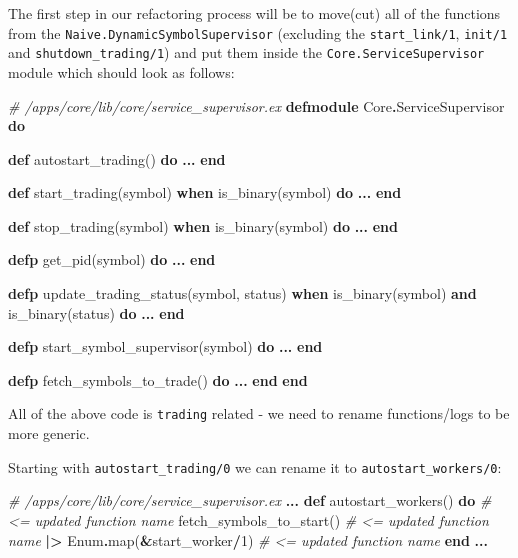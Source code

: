 \documentclass[
]{book}
\newenvironment{Shaded}{\begin{snugshade}}{\end{snugshade}}
\newcommand{\CommentTok}[1]{\textcolor[rgb]{0.56,0.35,0.01}{\textit{#1}}}
\newcommand{\ConstantTok}[1]{\textcolor[rgb]{0.00,0.00,0.00}{#1}}
\newcommand{\DecValTok}[1]{\textcolor[rgb]{0.00,0.00,0.81}{#1}}
\newcommand{\KeywordTok}[1]{\textcolor[rgb]{0.13,0.29,0.53}{\textbf{#1}}}
\newcommand{\NormalTok}[1]{#1}
\newcommand{\OperatorTok}[1]{\textcolor[rgb]{0.81,0.36,0.00}{\textbf{#1}}}
\begin{document}
The first step in our refactoring process will be to move(cut) all of the functions from the \texttt{Naive.DynamicSymbolSupervisor} (excluding the \texttt{start\_link/1}, \texttt{init/1} and \texttt{shutdown\_trading/1}) and put them inside the \texttt{Core.ServiceSupervisor} module which should look as follows:

\begin{Shaded}
\begin{Highlighting}[]
\CommentTok{\# /apps/core/lib/core/service\_supervisor.ex}
\KeywordTok{defmodule} \ConstantTok{Core}\OperatorTok{.}\ConstantTok{ServiceSupervisor} \KeywordTok{do}

  \KeywordTok{def}\NormalTok{ autostart\_trading() }\KeywordTok{do}
    \OperatorTok{...}
  \KeywordTok{end}

  \KeywordTok{def}\NormalTok{ start\_trading(symbol) }\KeywordTok{when}\NormalTok{ is\_binary(symbol) }\KeywordTok{do}
    \OperatorTok{...}
  \KeywordTok{end}

  \KeywordTok{def}\NormalTok{ stop\_trading(symbol) }\KeywordTok{when}\NormalTok{ is\_binary(symbol) }\KeywordTok{do}
    \OperatorTok{...}
  \KeywordTok{end}

  \KeywordTok{defp}\NormalTok{ get\_pid(symbol) }\KeywordTok{do}
    \OperatorTok{...}
  \KeywordTok{end}

  \KeywordTok{defp}\NormalTok{ update\_trading\_status(symbol, status)}
       \KeywordTok{when}\NormalTok{ is\_binary(symbol) }\KeywordTok{and}\NormalTok{ is\_binary(status) }\KeywordTok{do}
    \OperatorTok{...}
  \KeywordTok{end}

  \KeywordTok{defp}\NormalTok{ start\_symbol\_supervisor(symbol) }\KeywordTok{do}
    \OperatorTok{...}
  \KeywordTok{end}

  \KeywordTok{defp}\NormalTok{ fetch\_symbols\_to\_trade() }\KeywordTok{do}
    \OperatorTok{...}
  \KeywordTok{end}
\KeywordTok{end}
\end{Highlighting}
\end{Shaded}

All of the above code is \texttt{trading} related - we need to rename functions/logs to be more generic.

Starting with \texttt{autostart\_trading/0} we can rename it to \texttt{autostart\_workers/0}:

\begin{Shaded}
\begin{Highlighting}[]
  \CommentTok{\# /apps/core/lib/core/service\_supervisor.ex}
  \OperatorTok{...}
  \KeywordTok{def}\NormalTok{ autostart\_workers() }\KeywordTok{do}     \CommentTok{\# \textless{}= updated function name}
\NormalTok{    fetch\_symbols\_to\_start()     }\CommentTok{\# \textless{}= updated function name}
    \OperatorTok{|\textgreater{}} \ConstantTok{Enum}\OperatorTok{.}\NormalTok{map(}\OperatorTok{\&}\NormalTok{start\_worker}\OperatorTok{/}\DecValTok{1}\NormalTok{) }\CommentTok{\# \textless{}= updated function name}
  \KeywordTok{end}
  \OperatorTok{...}
\end{Highlighting}
\end{Shaded}
\end{document}
